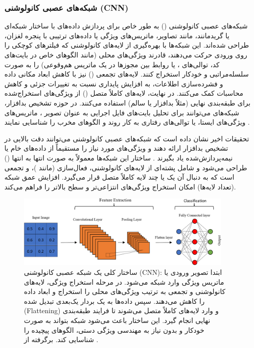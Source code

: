 \subsubsection{شبکه‌های عصبی کانولوشنی (CNN)}
شبکه‌های عصبی کانولوشنی () به طور خاص برای پردازش داده‌های با ساختار شبکه‌ای یا گریدمانند، مانند تصاویر، ماتریس‌های ویژگی یا داده‌های ترتیبی با پنجره لغزان، طراحی شده‌اند. این شبکه‌ها با بهره‌گیری از لایه‌های کانولوشنی که فیلترهای کوچکی را روی ورودی حرکت می‌دهند، قادرند ویژگی‌های محلی (مانند الگوهای خاص در بایت‌های کد، توالی‌های ، یا روابط بین مجوزها در یک ماتریس هم‌وقوعی) را به صورت سلسله‌مراتبی و خودکار استخراج کنند. لایه‌های تجمعی () نیز با کاهش ابعاد مکانی داده و فشرده‌سازی اطلاعات، به افزایش پایداری نسبت به تغییرات جزئی و کاهش محاسبات کمک می‌کنند. در نهایت، لایه‌های کاملاً متصل () از ویژگی‌های استخراج‌شده برای طبقه‌بندی نهایی (مثلاً بدافزار یا سالم) استفاده می‌کنند. در حوزه تشخیص بدافزار، شبکه‌های  می‌توانند برای تحلیل بایت‌های فایل اجرایی به عنوان تصویر ، ماتریس‌های ویژگی‌های ایستا، یا توالی‌های رفتاری به کار روند و الگوهای مخرب را شناسایی نمایند \cite{Vinayakumar2019}.

تحقیقات اخیر نشان داده است که شبکه‌های عصبی کانولوشنی می‌توانند دقت بالایی در تشخیص بدافزار ارائه دهند و ویژگی‌های مورد نیاز را مستقیماً از داده‌های خام یا نیمه‌پردازش‌شده یاد بگیرند \cite{Alsaleh2023}. ساختار این شبکه‌ها معمولاً به صورت انتها به انتها () طراحی می‌شود و شامل پشته‌ای از لایه‌های کانولوشنی، فعال‌سازی (مانند )، و تجمعی است که به دنبال آن یک یا چند لایه کاملاً متصل قرار می‌گیرد. افزایش عمق شبکه (تعداد لایه‌ها) امکان استخراج ویژگی‌های انتزاعی‌تر و سطح بالاتر را فراهم می‌کند.

\begin{figure}[!t]
    \centering
    \includegraphics[width=0.95\textwidth]{images/cnn_structure}
    \caption{ساختار کلی یک شبکه عصبی کانولوشنی (CNN): ابتدا تصویر ورودی یا ماتریس ویژگی وارد شبکه می‌شود. در مرحله استخراج ویژگی، لایه‌های کانولوشنی و تجمعی به ترتیب ویژگی‌های محلی را استخراج و ابعاد داده را کاهش می‌دهند. سپس داده‌ها به یک بردار یک‌بعدی تبدیل شده (Flattening) و وارد لایه‌های کاملاً متصل می‌شوند تا فرایند طبقه‌بندی نهایی انجام گیرد. این ساختار باعث می‌شود شبکه بتواند به صورت خودکار و بدون نیاز به مهندسی ویژگی دستی، الگوهای پیچیده را شناسایی کند. برگرفته از \cite{Alsaleh2023}.}
    \label{fig:cnn_structure}
\end{figure}

